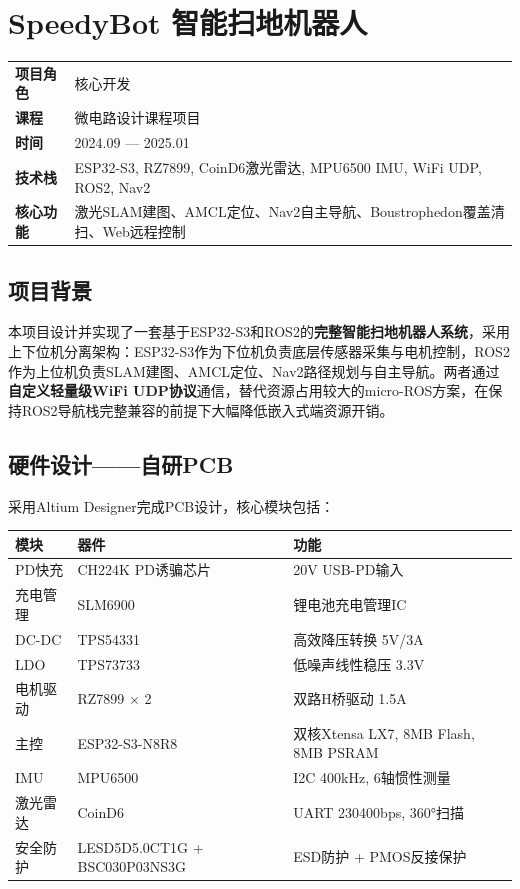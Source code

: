 \documentclass[12pt,a4paper]{ctexart}
\begin{document}
\newpage
\section{SpeedyBot 智能扫地机器人}

\begin{infobox}[项目概况]
\begin{tabular}{ll}
\textbf{项目角色} & 核心开发 \\
\textbf{课程}     & 微电路设计课程项目 \\
\textbf{时间}     & 2024.09 --- 2025.01 \\
\textbf{技术栈}   & ESP32-S3, RZ7899, CoinD6激光雷达, MPU6500 IMU, WiFi UDP, ROS2, Nav2 \\
\textbf{核心功能} & 激光SLAM建图、AMCL定位、Nav2自主导航、Boustrophedon覆盖清扫、Web远程控制
\end{tabular}
\end{infobox}

\subsection{项目背景}

本项目设计并实现了一套基于ESP32-S3和ROS2的\textbf{完整智能扫地机器人系统}，采用上下位机分离架构：ESP32-S3作为下位机负责底层传感器采集与电机控制，ROS2作为上位机负责SLAM建图、AMCL定位、Nav2路径规划与自主导航。两者通过\textbf{自定义轻量级WiFi UDP协议}通信，替代资源占用较大的micro-ROS方案，在保持ROS2导航栈完整兼容的前提下大幅降低嵌入式端资源开销。

\subsection{硬件设计——自研PCB}

采用Altium Designer完成PCB设计，核心模块包括：

\begin{center}
\begin{tabular}{lll}
\toprule
\textbf{模块} & \textbf{器件} & \textbf{功能} \\
\midrule
PD快充   & CH224K PD诱骗芯片 & 20V USB-PD输入 \\
充电管理 & SLM6900 & 锂电池充电管理IC \\
DC-DC    & TPS54331 & 高效降压转换 5V/3A \\
LDO      & TPS73733 & 低噪声线性稳压 3.3V \\
电机驱动 & RZ7899 $\times$ 2 & 双路H桥驱动 1.5A \\
主控     & ESP32-S3-N8R8 & 双核Xtensa LX7, 8MB Flash, 8MB PSRAM \\
IMU      & MPU6500 & I2C 400kHz, 6轴惯性测量 \\
激光雷达 & CoinD6 & UART 230400bps, 360°扫描 \\
安全防护 & LESD5D5.0CT1G + BSC030P03NS3G & ESD防护 + PMOS反接保护 \\
\bottomrule
\end{tabular}
\end{center}
\end{document}
